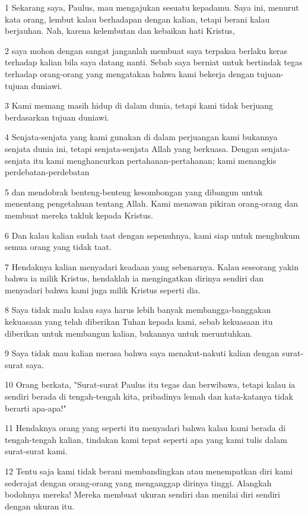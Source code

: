 \par 1 Sekarang saya, Paulus, mau mengajukan sesuatu kepadamu. Saya ini, menurut kata orang, lembut kalau berhadapan dengan kalian, tetapi berani kalau berjauhan. Nah, karena kelembutan dan kebaikan hati Kristus,
\par 2 saya mohon dengan sangat janganlah membuat saya terpaksa berlaku keras terhadap kalian bila saya datang nanti. Sebab saya berniat untuk bertindak tegas terhadap orang-orang yang mengatakan bahwa kami bekerja dengan tujuan-tujuan duniawi.
\par 3 Kami memang masih hidup di dalam dunia, tetapi kami tidak berjuang berdasarkan tujuan duniawi.
\par 4 Senjata-senjata yang kami gunakan di dalam perjuangan kami bukannya senjata dunia ini, tetapi senjata-senjata Allah yang berkuasa. Dengan senjata-senjata itu kami menghancurkan pertahanan-pertahanan; kami menangkis perdebatan-perdebatan
\par 5 dan mendobrak benteng-benteng kesombongan yang dibangun untuk menentang pengetahuan tentang Allah. Kami menawan pikiran orang-orang dan membuat mereka takluk kepada Kristus.
\par 6 Dan kalau kalian sudah taat dengan sepenuhnya, kami siap untuk menghukum semua orang yang tidak taat.
\par 7 Hendaknya kalian menyadari keadaan yang sebenarnya. Kalau seseorang yakin bahwa ia milik Kristus, hendaklah ia mengingatkan dirinya sendiri dan menyadari bahwa kami juga milik Kristus seperti dia.
\par 8 Saya tidak malu kalau saya harus lebih banyak membangga-banggakan kekuasaan yang telah diberikan Tuhan kepada kami, sebab kekuasaan itu diberikan untuk membangun kalian, bukannya untuk meruntuhkan.
\par 9 Saya tidak mau kalian merasa bahwa saya menakut-nakuti kalian dengan surat-surat saya.
\par 10 Orang berkata, "Surat-surat Paulus itu tegas dan berwibawa, tetapi kalau ia sendiri berada di tengah-tengah kita, pribadinya lemah dan kata-katanya tidak berarti apa-apa!"
\par 11 Hendaknya orang yang seperti itu menyadari bahwa kalau kami berada di tengah-tengah kalian, tindakan kami tepat seperti apa yang kami tulis dalam surat-surat kami.
\par 12 Tentu saja kami tidak berani membandingkan atau menempatkan diri kami sederajat dengan orang-orang yang menganggap dirinya tinggi. Alangkah bodohnya mereka! Mereka membuat ukuran sendiri dan menilai diri sendiri dengan ukuran itu.
